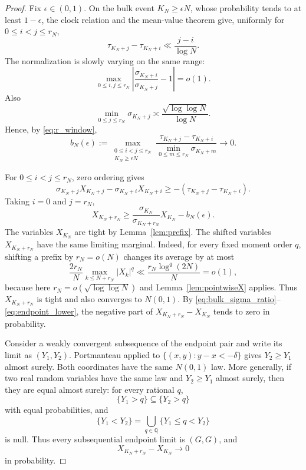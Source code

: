 \documentclass[pdflatex,sn-mathphys-num]{sn-jnl}
\numberwithin{equation}{section}
\theoremstyle{thmstyleone}
\theoremstyle{thmstylethree}
\theoremstyle{thmstyletwo}
\newcommand{\1}{\mathbf 1}
\begin{document}
\begin{proof}
Fix $\epsilon\in(0,1)$.  On the bulk event $K_N\ge\epsilon N$, whose probability tends to
at least $1-\epsilon$, the clock relation and the mean-value theorem give, uniformly for
$0\le i<j\le r_N$,
\begin{equation}
 \tau_{K_N+j}-\tau_{K_N+i}
 \ll
 \frac{j-i}{\log N}.
\label{eq:bulk_clock_increment}
\end{equation}
The normalization is slowly varying on the same range:
\begin{equation}
 \max_{0\le i,j\le r_N}
 \left|\frac{\sigma_{K_N+i}}{\sigma_{K_N+j}}-1\right|
 =o(1).
\label{eq:bulk_sigma_ratio}
\end{equation}
Also
\begin{equation}
 \min_{0\le j\le r_N}\sigma_{K_N+j}
 \asymp
 \frac{\sqrt{\log\log N}}{\log N}.
\label{eq:bulk_sigma_size}
\end{equation}
Hence, by \eqref{eq:r_window},
\begin{equation}
 b_N(\epsilon):=
 \max_{\substack{0\le i<j\le r_N\\K_N\ge\epsilon N}}
 \frac{\tau_{K_N+j}-\tau_{K_N+i}}
      {\min_{0\le m\le r_N}\sigma_{K_N+m}}
 \longrightarrow0.
\label{eq:bulk_error}
\end{equation}

For $0\le i<j\le r_N$, zero ordering gives
\begin{equation}
 \sigma_{K_N+j}X_{K_N+j}
 -
 \sigma_{K_N+i}X_{K_N+i}
 \ge
 -(\tau_{K_N+j}-\tau_{K_N+i}).
\label{eq:ordered_sigma_X}
\end{equation}
Taking $i=0$ and $j=r_N$,
\begin{equation}
 X_{K_N+r_N}
 \ge
 \frac{\sigma_{K_N}}{\sigma_{K_N+r_N}}X_{K_N}
 -b_N(\epsilon).
\label{eq:endpoint_lower}
\end{equation}
The variables $X_{K_N}$ are tight by Lemma~\ref{lem:prefix}.  The shifted variables \(X_{K_N+r_N}\) have the same limiting marginal.  Indeed,
for every fixed moment order \(q\), shifting a prefix by \(r_N=o(N)\) changes its
average by at most
\[
 \frac{2r_N}{N}\max_{k\le N+r_N}|X_k|^q
 \ll \frac{r_N\log^q(2N)}{N}=o(1),
\]
because here \(r_N=o(\sqrt{\log\log N})\) and Lemma~\ref{lem:pointwiseX} applies.
Thus \(X_{K_N+r_N}\) is tight and also converges to \(N(0,1)\).  By \eqref{eq:bulk_sigma_ratio}--\eqref{eq:endpoint_lower},
the negative part of $X_{K_N+r_N}-X_{K_N}$ tends to zero in probability.

Consider a weakly convergent subsequence of the endpoint pair and write its limit as
$(Y_1,Y_2)$.  Portmanteau applied to
$\{(x,y):y-x<-\delta\}$ gives $Y_2\ge Y_1$ almost surely.  Both coordinates have the
same $N(0,1)$ law.  More generally, if two real random variables have the same law and
$Y_2\ge Y_1$ almost surely, then they are equal almost surely: for every rational $q$,
\[
 \{Y_1>q\}\subseteq\{Y_2>q\}
\]
with equal probabilities, and
\[
 \{Y_1<Y_2\}
 =
 \bigcup_{q\in\mathbb Q}\{Y_1\le q<Y_2\}
\]
is null.  Thus every subsequential endpoint limit is $(G,G)$, and
\begin{equation}
 X_{K_N+r_N}-X_{K_N}\longrightarrow0
\label{eq:endpoint_collapse}
\end{equation}
in probability.


\end{proof}
\end{document}
